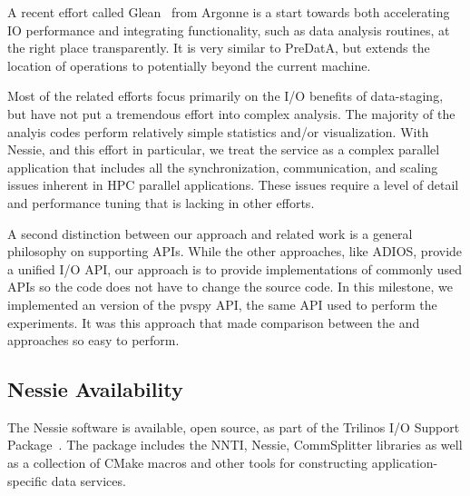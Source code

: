 A recent effort called Glean~\cite{vishwanath:2011:glean} from Argonne is a
start towards both accelerating IO performance and integrating
functionality, such as data analysis routines, at the right place
transparently. It is very similar to PreDatA, but extends the location of
operations to potentially beyond the current machine.

Most of the related efforts focus primarily on the I/O benefits of data-staging, but
have not put a tremendous effort into complex analysis. The majority of the analyis
codes perform relatively simple statistics and/or visualization.  With Nessie, and 
this effort in particular, we treat the service as a complex parallel application
that includes all the synchronization, communication, and scaling issues inherent in HPC 
parallel applications.  These issues require a level of detail and performance 
tuning that is lacking in other efforts.  

A second distinction between our approach and related work is a general 
philosophy on supporting APIs.  While the other approaches, like ADIOS,
provide a unified I/O API, our approach is to provide \intransit
implementations of commonly used APIs so the code does not have to change the
source code.  In this milestone, we implemented an \intransit version of
the pvspy API, the same API used to perform the \insitu experiments.  It was
this approach that made comparison between the \insitu and \intransit
approaches so easy to perform.

\subsection{Nessie Availability}

The Nessie software is available, open source, as part
of the Trilinos I/O Support Package~\cite{oldfield:2012:trios-journal}.
The package includes the NNTI, Nessie, CommSplitter libraries as well
as a collection of CMake macros and other tools for constructing 
application-specific data services.


